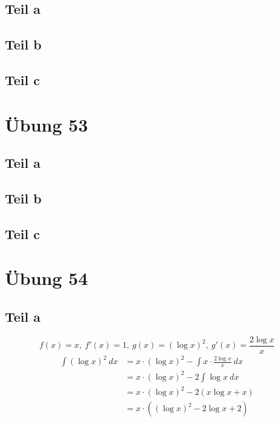 \documentclass[a4paper,10pt]{article}
\begin{document}
\subsection*{Teil a}

\subsection*{Teil b}

\subsection*{Teil c}

\section*{Übung 53}

\subsection*{Teil a}

\subsection*{Teil b}

\subsection*{Teil c}

\section*{Übung 54}

\subsection*{Teil a}

\begin{equation}
 f(x) = x,\ f'(x) = 1,\ g(x) = (\log x)^2,\ g'(x) = \frac{2 \log x}{x}
\end{equation}
\begin{align*}
 \int (\log x)^2\ dx & = x \cdot (\log x)^2 - \int x \cdot \frac{2 \log x}{x}\ dx\\
 & = x \cdot (\log x)^2 - 2 \int \log x\ dx\\
 & = x \cdot (\log x)^2 - 2 (x \log x + x)\\
 & = x \cdot ((\log x)^2 - 2 \log x + 2)\\
\end{align*}
\end{document}
